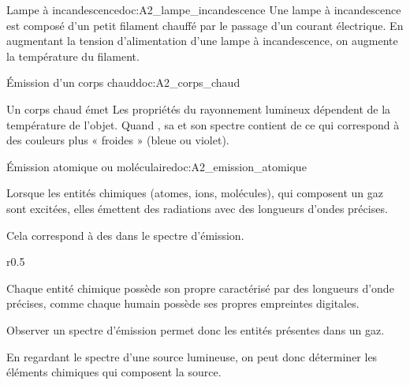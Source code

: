 \begin{doc}{Lampe à incandescence}{doc:A2_lampe_incandescence}  
  Une lampe à incandescence est composé d'un petit filament chauffé par le passage d'un courant électrique.
  En augmentant la tension d'alimentation d'une lampe à incandescence, on augmente la température du filament.
\end{doc}



\begin{doc}{Émission d'un corps chaud}{doc:A2_corps_chaud}
  \begin{importants}
    Un corps chaud émet  
    Les propriétés du rayonnement lumineux dépendent de la température de l'objet.
    Quand , sa  et son spectre contient de  ce qui correspond à des couleurs plus « froides » (bleue ou violet).
  \end{importants}
\end{doc}




\begin{doc}{Émission atomique ou moléculaire}{doc:A2_emission_atomique}
  \begin{importants}
    Lorsque les entités chimiques (atomes, ions, molécules), qui composent un gaz sont excitées, elles émettent des radiations avec des longueurs d'ondes précises.
    
    Cela correspond à des  dans le spectre d'émission.
  \end{importants}
  
  \begin{wrapfigure}{r}{0.5\linewidth}
    \centering
    \vspace*{-22pt}
  \end{wrapfigure}
    
  Chaque entité chimique possède son propre  caractérisé par des longueurs d'onde précises, comme chaque humain possède ses propres empreintes digitales.
  \medskip

  Observer un spectre d'émission permet donc  les entités présentes dans un gaz.
  \medskip

  En regardant le spectre d'une source lumineuse, on peut donc déterminer les éléments chimiques qui composent la source.
\end{doc}


